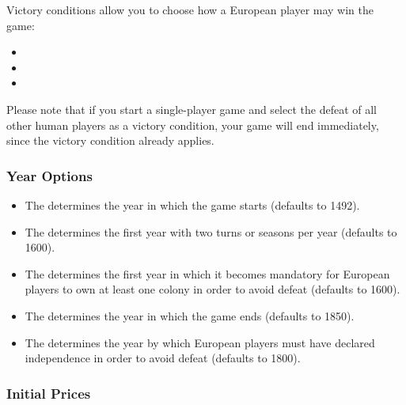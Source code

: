 \documentclass[12pt]{book}
\begin{document}
Victory conditions allow you to choose how a European player may win
the game:

\begin{itemize}

\item {}

\item {}

\item {}

\end{itemize}

Please note that if you start a single-player game and select the
defeat of all other human players as a victory condition, your game
will end immediately, since the victory condition already applies.


\hypertarget{year options}{\subsubsection{Year Options}}

\begin{itemize}

\item The  determines the year in which the game
  starts (defaults to 1492).

\item The  determines the first year with two
  turns or seasons per year (defaults to 1600).

\item The  determines the first year in
  which it becomes mandatory for European players to own at least one
  colony in order to avoid defeat (defaults to 1600).

\item The  determines the year in which the
  game ends (defaults to 1850).

\item The  determines the year by
  which European players must have declared independence in order to
  avoid defeat (defaults to 1800).

\end{itemize}


\hypertarget{initial prices}{\subsubsection{Initial Prices}}
\end{document}
